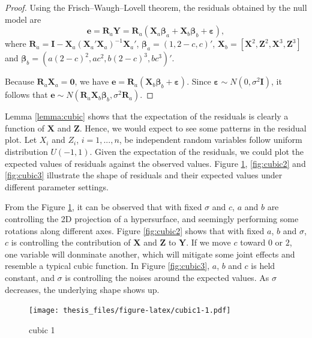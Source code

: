 \documentclass{monashthesis}
\theoremstyle{definition}
\theoremstyle{definition}
\theoremstyle{definition}
\theoremstyle{definition}
\theoremstyle{remark}
\begin{document}
\begin{proof}
Using the Frisch–Waugh–Lovell theorem, the residuals obtained by the null model are $$\boldsymbol{e}=\boldsymbol{R}_a\boldsymbol{Y}=\boldsymbol{R}_a(\boldsymbol{X}_a\boldsymbol{\beta}_a+\boldsymbol{X}_b\boldsymbol{\beta}_b+\boldsymbol{\varepsilon}),$$ where $\boldsymbol{R}_a=\boldsymbol{I}-\boldsymbol{X}_a(\boldsymbol{X}_a'\boldsymbol{X}_a)^{-1}\boldsymbol{X}_a'$, $\boldsymbol{\beta}_a=(1,2-c,c)'$, $\boldsymbol{X}_b=[\boldsymbol{X}^2,\boldsymbol{Z}^2,\boldsymbol{X}^3,\boldsymbol{Z}^3]$ and $\boldsymbol{\beta}_b=(a(2-c)^2,ac^2,b(2-c)^3,bc^3)'$. 

Because $\boldsymbol{R}_a\boldsymbol{X}_a=\boldsymbol{0}$, we have $\boldsymbol{e}=\boldsymbol{R}_a(\boldsymbol{X}_b\boldsymbol{\beta}_b+\boldsymbol{\varepsilon}).$ Since $\boldsymbol{\varepsilon} \sim N(0,\sigma^2\boldsymbol{I})$, it follows that $\boldsymbol{e} \sim N(\boldsymbol{R}_a\boldsymbol{X}_b\boldsymbol{\beta}_b, \sigma^2\boldsymbol{R}_a)$. 
\end{proof}

Lemma \ref{lemma:cubic} shows that the expectation of the residuals is clearly a function of \(\boldsymbol{X}\) and \(\boldsymbol{Z}\). Hence, we would expect to see some patterns in the residual plot. Let \(X_i\) and \(Z_i\), \(i = 1,...,n\), be independent random variables follow uniform distribution \(U(-1,1)\). Given the expectation of the residuals, we could plot the expected values of residuals against the observed values. Figure \ref{fig:cubic1}, \ref{fig:cubic2} and \ref{fig:cubic3} illustrate the shape of residuals and their expected values under different parameter settings.

From the Figure \ref{fig:cubic1}, it can be observed that with fixed \(\sigma\) and \(c\), \(a\) and \(b\) are controlling the 2D projection of a hypersurface, and seemingly performing some rotations along different axes. Figure \ref{fig:cubic2} shows that with fixed \(a\), \(b\) and \(\sigma\), \(c\) is controlling the contribution of \(\boldsymbol{X}\) and \(\boldsymbol{Z}\) to \(\boldsymbol{Y}\). If we move \(c\) toward \(0\) or \(2\), one variable will donminate another, which will mitigate some joint effects and resemble a typical cubic function. In Figure \ref{fig:cubic3}, \(a\), \(b\) and \(c\) is held constant, and \(\sigma\) is controlling the noises around the expected values. As \(\sigma\) decreases, the underlying shape shows up.

\begin{figure}
\centering
\texttt{[image: thesis\_files/figure-latex/cubic1-1.pdf]}
\caption{\label{fig:cubic1}cubic 1}
\end{figure}
\end{document}
